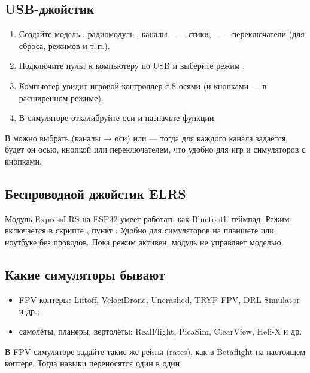\subsection{USB-джойстик}

\begin{enumerate}
  \item Создайте модель : радиомодуль , каналы -- ---
        стики, -- --- переключатели (для сброса, режимов и т.\,п.).
  \item Подключите пульт к компьютеру по USB и выберите режим .
  \item Компьютер увидит игровой контроллер с 8 осями (и кнопками --- в расширенном режиме).
  \item В симуляторе откалибруйте оси и назначьте функции.
\end{enumerate}

В  можно выбрать  (каналы → оси) или
 --- тогда для каждого канала задаётся, будет он осью, кнопкой или
переключателем, что удобно для игр и симуляторов с кнопками.

\subsection{Беспроводной джойстик ELRS}

Модуль ExpressLRS на ESP32 умеет работать как Bluetooth-геймпад. Режим включается в скрипте
, пункт . Удобно для симуляторов на планшете или ноутбуке без проводов.
Пока режим активен, модуль не управляет моделью.

\subsection{Какие симуляторы бывают}

\begin{itemize}
  \item FPV-коптеры: Liftoff, VelociDrone, Uncrashed, TRYP FPV, DRL Simulator и др.;
  \item самолёты, планеры, вертолёты: RealFlight, PicaSim, ClearView, Heli-X и др.
\end{itemize}

\begin{tip}
В FPV-симуляторе задайте такие же рейты (rates), как в Betaflight на настоящем
коптере. Тогда навыки переносятся один в один.
\end{tip}

